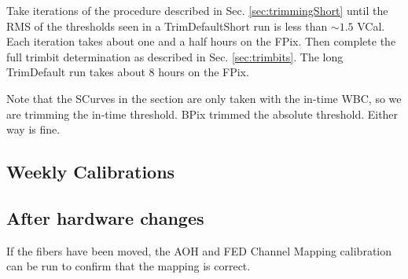 Take iterations of the procedure described in Sec. \ref{sec:trimmingShort} until the
RMS of the thresholds seen in a TrimDefaultShort run is less than $\sim 1.5$ VCal. Each iteration takes
about one and a half hours on the FPix. Then complete the
full trimbit determination as described in Sec. \ref{sec:trimbits}.  The long TrimDefault run
takes about 8 hours on the FPix.

Note that the SCurves in the section are only taken with the in-time WBC, so we are trimming
the in-time threshold.  BPix trimmed the absolute threshold.  Either way is fine.  

\subsection{Weekly Calibrations}

\subsection{After hardware changes} 
If the fibers have been moved, the AOH and FED Channel Mapping calibration can be run
to confirm that the mapping is correct.  

